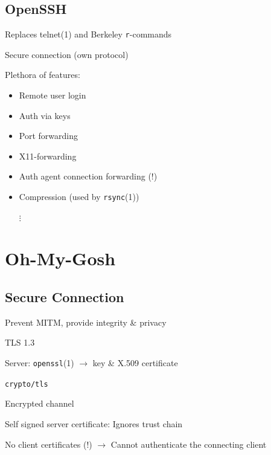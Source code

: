 \documentclass[
	xcolor=dvipsnames,
	handout
]{beamer}
\newenvironment{zhawframe}[1][]
{\begin{frame}[environment=fr,#1]{\insertsubsectionhead}{\insertsectionhead}}
{\end{frame}
}
\begin{document}
\subsection{OpenSSH}
\begin{zhawframe}
 Replaces telnet(1) and Berkeley \texttt{r}-commands

 Secure connection (own protocol)

 Plethora of features:
	\begin{itemize}
	\item<3-> Remote user login
	\item<3-> Auth via keys
	\item<3-> Port forwarding
	\item<3-> X11-forwarding
	\item<3-> Auth agent connection forwarding (!)
	\item<3-> Compression (used by \texttt{rsync}(1))

	\hspace{3mm}$\vdots$
	\end{itemize}
\end{zhawframe}

\section{Oh-My-Gosh}
\subsection{Secure Connection}
\begin{zhawframe}
 Prevent MITM, provide integrity \& privacy

 TLS 1.3

 Server: \texttt{openssl}(1) $\rightarrow$ key \& X.509 certificate

 \texttt{crypto/tls}

 Encrypted channel

 Self signed server certificate: Ignores trust chain

 No client certificates (!) $\rightarrow$ Cannot authenticate the connecting client
\end{zhawframe}
\end{document}
